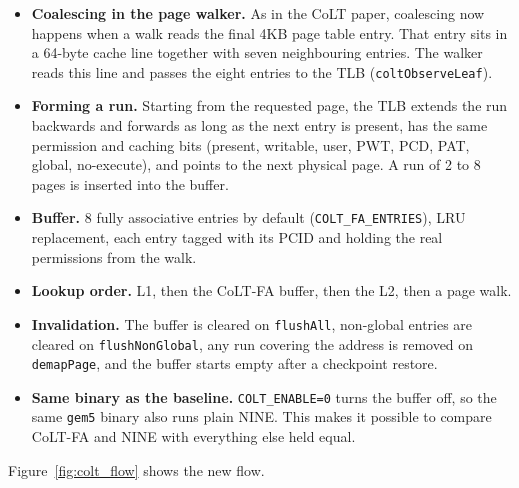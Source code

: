 \begin{itemize}
    \item \textbf{Coalescing in the page walker.} As in the CoLT paper, coalescing now happens when a walk reads the final 4KB page table entry. That entry sits in a 64-byte cache line together with seven neighbouring entries. The walker reads this line and passes the eight entries to the TLB (\texttt{coltObserveLeaf}).
    \item \textbf{Forming a run.} Starting from the requested page, the TLB extends the run backwards and forwards as long as the next entry is present, has the same permission and caching bits (present, writable, user, PWT, PCD, PAT, global, no-execute), and points to the next physical page. A run of 2 to 8 pages is inserted into the buffer.
    \item \textbf{Buffer.} 8 fully associative entries by default (\texttt{COLT\_FA\_ENTRIES}), LRU replacement, each entry tagged with its PCID and holding the real permissions from the walk.
    \item \textbf{Lookup order.} L1, then the CoLT-FA buffer, then the L2, then a page walk.
    \item \textbf{Invalidation.} The buffer is cleared on \texttt{flushAll}, non-global entries are cleared on \texttt{flushNonGlobal}, any run covering the address is removed on \texttt{demapPage}, and the buffer starts empty after a checkpoint restore.
    \item \textbf{Same binary as the baseline.} \texttt{COLT\_ENABLE=0} turns the buffer off, so the same \texttt{gem5} binary also runs plain NINE. This makes it possible to compare CoLT-FA and NINE with everything else held equal.
\end{itemize}

Figure~\ref{fig:colt_flow} shows the new flow.

